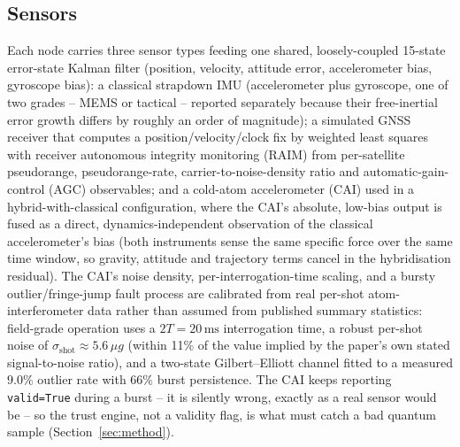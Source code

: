 \documentclass[journal]{IEEEtran}
\begin{document}
\subsection{Sensors}
Each node carries three sensor types feeding one shared, loosely-coupled 15-state error-state Kalman
filter (position, velocity, attitude error, accelerometer bias, gyroscope bias): a classical strapdown
IMU (accelerometer plus gyroscope, one of two grades -- MEMS or tactical -- reported separately because
their free-inertial error growth differs by roughly an order of magnitude); a simulated GNSS receiver
that computes a position/velocity/clock fix by weighted least squares with receiver autonomous integrity
monitoring (RAIM) from per-satellite pseudorange, pseudorange-rate, carrier-to-noise-density ratio and
automatic-gain-control (AGC) observables; and a cold-atom accelerometer (CAI) used in a
hybrid-with-classical configuration, where the CAI's absolute, low-bias output is fused as a direct,
dynamics-independent observation of the classical accelerometer's bias (both instruments sense the same
specific force over the same time window, so gravity, attitude and trajectory terms cancel in the
hybridisation residual). The CAI's noise density, per-interrogation-time scaling, and a bursty
outlier/fringe-jump fault process are calibrated from real per-shot atom-interferometer data
\cite{darmagnac2024atom} rather than assumed from published summary statistics: field-grade operation
uses a $2T = 20\,\mathrm{ms}$ interrogation time, a robust per-shot noise of $\sigma_{\mathrm{shot}}
\approx 5.6\,\mu g$ (within 11\% of the value implied by the paper's own stated signal-to-noise ratio),
and a two-state Gilbert--Elliott channel fitted to a measured $9.0\%$ outlier rate with $66\%$ burst
persistence. The CAI keeps reporting \texttt{valid=True} during a burst -- it is silently wrong, exactly
as a real sensor would be -- so the trust engine, not a validity flag, is what must catch a bad quantum
sample (Section~\ref{sec:method}).
\end{document}

